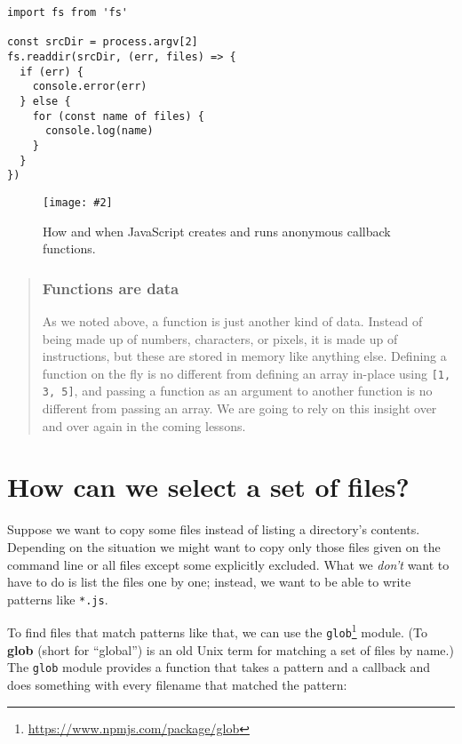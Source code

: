 \documentclass[krantzl]{krantz}
\newcommand{\figpdf}[4]{\begin{figure}%
\centering%
\texttt{[image: \#2]}%
\caption{#3}%
\label{#1}%
\end{figure}}
\newcommand{\glossref}[1]{\textbf{#1}}
\newenvironment{callout}{\savenotes\begin{tBox}\begin{quotation}\toggletrue{inbox}\renewcommand{\thempfootnote}{\arabic{footnote}}}{\end{quotation}\vspace{\baselineskip}\end{tBox}\togglefalse{inbox}\spewnotes}
\newcommand{\hreffoot}[2]{{#1}\footnote{\href{#2}{#2}}}
\begin{document}
\begin{lstlisting}[frame=tblr]
import fs from 'fs'

const srcDir = process.argv[2]
fs.readdir(srcDir, (err, files) => {
  if (err) {
    console.error(err)
  } else {
    for (const name of files) {
      console.log(name)
    }
  }
})
\end{lstlisting}


\figpdf{systems-programming-anonymous-functions}{./systems-programming/anonymous-functions.pdf}{How and when JavaScript creates and runs anonymous callback functions.}{0.6}

\begin{callout}


\subsubsection*{Functions are data}


As we noted above,
a function is just another kind of data.
Instead of being made up of numbers, characters, or pixels, it is made up of instructions,
but these are stored in memory like anything else.
Defining a function on the fly is no different from defining an array in-place using \texttt{[1, 3, 5]},
and passing a function as an argument to another function is no different from passing an array.
We are going to rely on this insight over and over again in the coming lessons.

\end{callout}

\section{How can we select a set of files?}\label{systems-programming-fileset}


Suppose we want to copy some files instead of listing a directory’s contents.
Depending on the situation
we might want to copy only those files given on the command line
or all files except some explicitly excluded.
What we \emph{don’t} want to have to do is list the files one by one;
instead,
we want to be able to write patterns like \texttt{*.js}.


To find files that match patterns like that,
we can use the \hreffoot{\texttt{glob}}{https://www.npmjs.com/package/glob} module.
(To \glossref{glob} (short for “global”) is an old Unix term for matching a set of files by name.)
The \texttt{glob} module provides a function that takes a pattern and a callback
and does something with every filename that matched the pattern:
\end{document}

